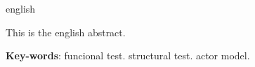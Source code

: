 \begin{resumo}[Abstract]
 \begin{otherlanguage*}{english}
   
   This is the english abstract. 

   \vspace{\onelineskip}
 
   \noindent 
   \textbf{Key-words}: funcional test. structural test. actor model. 
 \end{otherlanguage*}
\end{resumo}

\listoffigures*
\cleardoublepage

\listoftables*
\cleardoublepage

